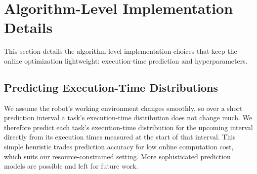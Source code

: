 \section{Algorithm-Level Implementation Details}
\label{section_implementation}

    This section details the algorithm-level implementation choices that keep the online optimization lightweight: execution-time prediction and hyperparameters.

    \subsection{Predicting Execution-Time Distributions}
    \label{section: predict_ET_exp}
    We assume the robot's working environment changes smoothly, so over a short prediction interval a task's execution-time distribution does not change much.
    We therefore predict each task's execution-time distribution for the upcoming interval directly from its execution times measured at the start of that interval.
    This simple heuristic trades prediction accuracy for low online computation cost, which suits our resource-constrained setting.
    More sophisticated prediction models are possible and left for future work.



